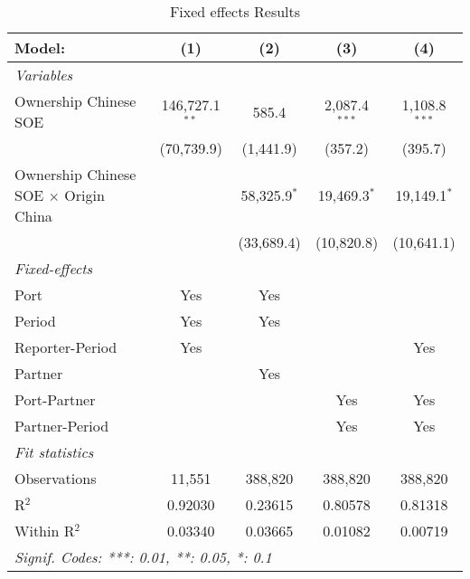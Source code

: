 \begin{table}[htbp]    \caption{Fixed effects Results}    \centering    \begin{adjustbox}{width = \textwidth, center}       \begin{tabular}{lcccc}          \tabularnewline \midrule \midrule          Model:                                       & (1)              & (2)            & (3)             & (4)\\            \midrule          \emph{Variables}\\          Ownership Chinese SOE                        & 146,727.1$^{**}$ & 585.4          & 2,087.4$^{***}$ & 1,108.8$^{***}$\\                                                          & (70,739.9)       & (1,441.9)      & (357.2)         & (395.7)\\             Ownership Chinese SOE $\times$ Origin China  &                  & 58,325.9$^{*}$ & 19,469.3$^{*}$  & 19,149.1$^{*}$\\                                                          &                  & (33,689.4)     & (10,820.8)      & (10,641.1)\\             \midrule          \emph{Fixed-effects}\\          Port                                         & Yes              & Yes            &                 & \\            Period                                       & Yes              & Yes            &                 & \\            Reporter-Period                              & Yes              &                &                 & Yes\\            Partner                                      &                  & Yes            &                 & \\            Port-Partner                                 &                  &                & Yes             & Yes\\            Partner-Period                               &                  &                & Yes             & Yes\\            \midrule          \emph{Fit statistics}\\          Observations                                 & 11,551           & 388,820        & 388,820         & 388,820\\            R$^2$                                        & 0.92030          & 0.23615        & 0.80578         & 0.81318\\            Within R$^2$                                 & 0.03340          & 0.03665        & 0.01082         & 0.00719\\            \midrule \midrule          \multicolumn{5}{l}{\emph{Signif. Codes: ***: 0.01, **: 0.05, *: 0.1}}\\       \end{tabular}    \end{adjustbox} \end{table}